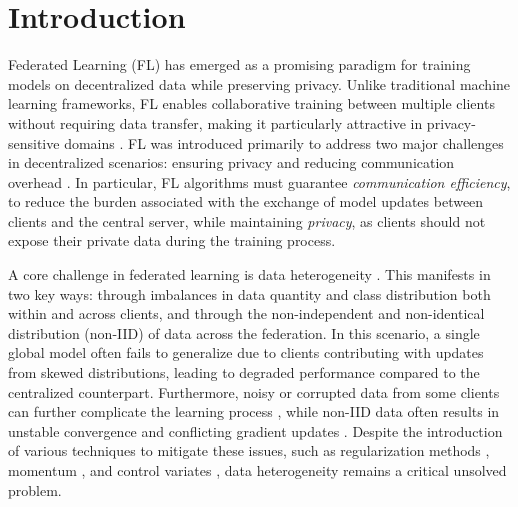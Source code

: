 \section{Introduction}

Federated Learning (FL) \citep{mcmahan2017communication} has emerged as a promising paradigm for training models on decentralized data while preserving privacy. Unlike traditional machine learning frameworks, FL enables collaborative training between multiple clients without requiring data transfer, making it particularly attractive in privacy-sensitive domains \citep{bonawitz2019federated}. FL was introduced primarily to address two major challenges in decentralized scenarios: ensuring privacy \citep{kairouz2021advances} and reducing communication overhead \citep{hamer2020fedboost, asad2020fedopt}. 
In particular, FL algorithms must guarantee \textit{communication efficiency}, to reduce the burden associated with the exchange of model updates between clients and the central server, while maintaining \textit{privacy}, as clients should not expose their private data during the training process.

A core challenge in federated learning is data heterogeneity \citep{li2020federated}. This manifests in two key ways: through imbalances in data quantity and class distribution both within and across clients, and through the non-independent and non-identical distribution (non-IID) of data across the federation. In this scenario, a single global model often fails to generalize due to clients contributing with updates from skewed distributions, leading to degraded performance \citep{zhao2018federated, caldarola2022improving} compared to the centralized counterpart. Furthermore, noisy or corrupted data from some clients can further complicate the learning process \citep{cao2020fltrust,zhang2022fldetector}, while non-IID data often results in unstable convergence and conflicting gradient updates \citep{hsieh2020non, zhao2018federated}. Despite the introduction of various techniques to mitigate these issues, such as regularization methods \citep{li2020federated}, momentum \citep{mendieta2022local}, and control variates \citep{karimireddy2020scaffold}, data heterogeneity remains a critical unsolved problem.

